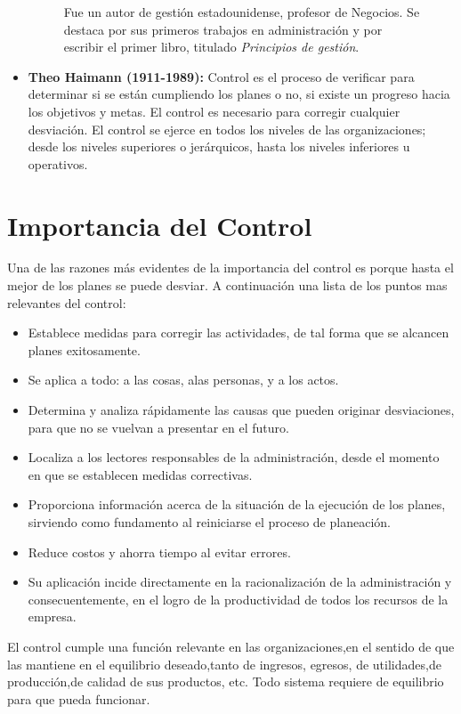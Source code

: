 \documentclass[12pt,letterpaper]{article}
\begin{document}
\begin{itemize}
\begin{figure}[h]
\caption{Fue un autor de gestión estadounidense, profesor de Negocios. Se destaca por sus primeros trabajos en administración y por escribir el primer libro, titulado \textit{Principios de gestión}.}
\end{figure}
\item \textbf{Theo Haimann (1911-1989):} Control es el proceso de verificar para determinar si se están cumpliendo los planes o no, si existe un progreso hacia los objetivos
y metas. El control es necesario para corregir cualquier desviación. El
control se ejerce en todos los niveles de las organizaciones; desde
los niveles superiores o jerárquicos, hasta los niveles inferiores u
operativos.
\end{itemize}
\section{Importancia del Control}
Una de las razones más evidentes de la importancia del control es porque hasta el mejor de los planes se puede desviar. A continuación una lista de los puntos mas relevantes del control:
\begin{itemize}

\item Establece medidas para corregir las actividades, de tal forma que se alcancen planes exitosamente.
\item Se aplica a todo: a las cosas, alas personas, y a los actos.
\item Determina y analiza rápidamente las causas que pueden originar desviaciones, para que no se vuelvan a presentar en el futuro.
\item Localiza a los lectores responsables de la administración, desde el momento en que se establecen medidas correctivas.
\item Proporciona información acerca de la situación de la ejecución de los planes, sirviendo como fundamento al reiniciarse el proceso de planeación.
\item Reduce costos y ahorra tiempo al evitar errores.
\item Su aplicación incide directamente en la racionalización de la administración y consecuentemente, en el logro de la productividad de todos los recursos de la empresa.
\end{itemize}
El control cumple una función relevante en las organizaciones,en el sentido
de que las mantiene en el equilibrio deseado,tanto de ingresos, egresos, de
utilidades,de producción,de calidad de sus productos, etc. Todo sistema
requiere de equilibrio para que pueda funcionar.  \\${ }$\\
\end{document}
